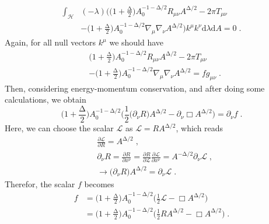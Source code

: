\documentclass[11pt,twocolumn]{article}
\begin{document}
    \begin{align} \label{eq19}
    \int_{\mathcal{H}}^{}& (-\lambda) \Bigg(\Big(1+\frac{\mathrm{\Delta}}{2}\Big) A_0^{-1-\mathrm{\Delta}/2} R_{\mu \nu} A^{\mathrm{\Delta}/2}-2\pi T_{\mu \nu} \nonumber \\
    &-\Big(1+\frac{\mathrm{\Delta}}{2}\Big) A_0^{-1-\mathrm{\Delta}/2} \nabla_{\mu} \nabla_{\nu} A^{\mathrm{\Delta}/2}\Bigg) k^{\mu} k^{\nu} \mathrm{d}\lambda \mathrm{d}A=0 \;.
    \end{align}
Again, for all null vectors $k^{\mu}$ we should have
    \begin{align} \label{eq20}
    &\Big(1+\frac{\mathrm{\Delta}}{2}\Big) A_0^{-1-\mathrm{\Delta}/2} R_{\mu \nu} A^{\mathrm{\Delta}/2}-2\pi T_{\mu \nu} \nonumber \\
    &-\Big(1+\frac{\mathrm{\Delta}}{2}\Big) A_0^{-1-\mathrm{\Delta}/2} \nabla_{\mu} \nabla_{\nu} A^{\mathrm{\Delta}/2}=f g_{\mu \nu} \;.
    \end{align}
Then, considering energy-momentum conservation, and after doing
some calculations, we obtain
    \begin{equation}  \label{eq21}
    \Big(1+\frac{\mathrm{\Delta}}{2}\Big) A_0^{-1-\mathrm{\Delta}/2} \Bigg(\frac{1}{2} \big(\partial_{\nu} R\big) A^{\mathrm{\Delta}/2}-\partial_{\nu} \Box A^{\mathrm{\Delta}/2}\Bigg)=\partial_{\nu} f \;.
    \end{equation}
Here, we can choose the scalar $\mathcal{L}$ as $\mathcal{L}=R
A^{\mathrm{\Delta}/2}$, which reads
    \begin{align} \label{eq22}
    & \frac{\partial \mathcal{L}}{\partial R}=A^{\mathrm{\Delta}/2} \;, \nonumber\\
    & \partial_{\nu} R=\frac{\partial R}{\partial x^{\nu}}=\frac{\partial R}{\partial \mathcal{L}}\frac{\partial \mathcal{L}}{\partial x^{\nu}}=A^{-\mathrm{\Delta}/2} \partial_{\nu}\mathcal{L} \;,  \nonumber\\
    & \to \big(\partial_{\nu} R\big) A^{\mathrm{\Delta}/2}=\partial_{\nu}\mathcal{L} \;.
    \end{align}
Therefor, the scalar $f$ becomes
    \begin{align}  \label{eq23}
    f&=\Big(1+\frac{\mathrm{\Delta}}{2}\Big) A_0^{-1-\mathrm{\Delta}/2} \Big(\frac{1}{2} \mathcal{L}- \Box A^{\mathrm{\Delta}/2}\Big) \nonumber \\
    &=\Big(1+\frac{\mathrm{\Delta}}{2}\Big) A_0^{-1-\mathrm{\Delta}/2} \Big(\frac{1}{2} R A^{\mathrm{\Delta}/2} - \Box A^{\mathrm{\Delta}/2}\Big) \;.
    \end{align}
\end{document}
